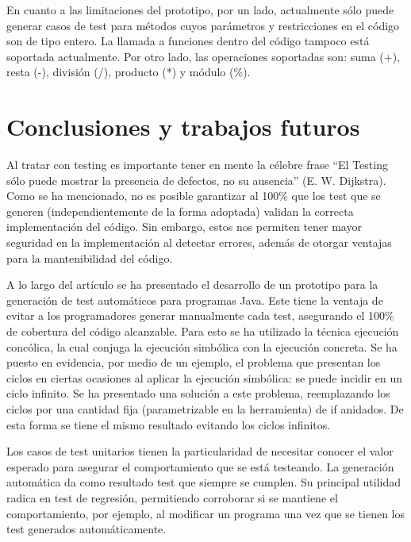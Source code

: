 \documentclass{llncs}
\begin{document}
En cuanto a las limitaciones del prototipo, por un lado, actualmente sólo puede generar casos de test para métodos cuyos parámetros y restricciones en el código son de tipo entero.
La llamada a funciones dentro del código tampoco está soportada actualmente. Por otro lado, las operaciones soportadas son: suma (+), resta (-),
división (/), producto (*) y módulo (\%).

\section{Conclusiones y trabajos futuros}
Al tratar con testing es importante tener en mente la célebre frase “El Testing sólo puede mostrar la presencia de defectos, no su ausencia” (E. W. Dijkstra).
Como se ha mencionado, no es posible garantizar al 100\% que los test que se generen (independientemente de la forma adoptada) validan la correcta
implementación del código. Sin embargo, estos nos permiten tener mayor seguridad en la implementación al detectar errores, además de otorgar ventajas
para la mantenibilidad del código.

A lo largo del artículo se ha presentado el desarrollo de un prototipo para la generación de test automáticos para programas Java. Este tiene la ventaja
de evitar a los programadores generar manualmente cada test, asegurando el 100\% de cobertura del código alcanzable. Para esto se ha utilizado la
técnica ejecución concólica, la cual conjuga la ejecución simbólica con la ejecución concreta. Se ha puesto en evidencia, por medio de un ejemplo,
el problema que presentan los ciclos en ciertas ocasiones al aplicar la ejecución simbólica: se puede incidir en un ciclo infinito.
Se ha presentado una solución a este problema, reemplazando los ciclos por una cantidad fija (parametrizable en la herramienta) de if anidados.
De esta forma se tiene el mismo resultado evitando los ciclos infinitos.

Los casos de test unitarios tienen la particularidad de necesitar conocer el valor esperado para asegurar el comportamiento que se está testeando.
La generación automática da como resultado test que siempre se cumplen. Su principal utilidad radica en test de regresión, permitiendo corroborar
si se mantiene el comportamiento, por ejemplo, al modificar un programa una vez que se tienen los test generados automáticamente.
\end{document}
